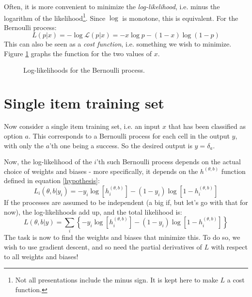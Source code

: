 \documentclass[12pt, a4paper]{article}
\numberwithin{equation}{section}
\begin{document}
Often, it is more convenient to minimize the \textit{log-likelihood}, i.e. minus the logarithm of the likelihood\footnote{Not all presentations include the minus sign. It is kept here to make $L$ a cost function.}. Since $\log$ is monotone, this is equivalent. For the Bernoulli process:
\begin{equation}
L(p|x)=-\log\mathcal{L}(p|x)=-x\log p-(1-x)\log(1-p)
\end{equation}
This can also be seen as a \textit{cost function}, i.e. something we wish to minimize. Figure \ref{fig:bernoulli} graphs the function for the two values of $x$.

\begin{figure}
\centering
{}
\caption{Log-likelihoods for the Bernoulli process.}
\label{fig:bernoulli}
\end{figure}

\section{Single item training set}
Now consider a single item training set, i.e. an input $x$ that has been classified as option $a$. This corresponds to a Bernoulli process for each cell in the output $y$, with only the $a$'th one being a success. So the desired output is $y=\delta_a$.

Now, the log-likelihood of the $i$'th such Bernoulli process depends on the actual choice of weights and biases - more specifically, it depends on the $h^{(\theta,b)}$ function defined in equation \ref{hypothesis}:
\begin{equation}
L_i(\theta,b|y_i)=-y_i\log\left[h^{(\theta,b)}_i\right]-(1-y_i)\log\left[1-h^{(\theta,b)}_i\right]
\end{equation}
If the processes are assumed to be independent (a big if, but let's go with that for now), the log-likelihoods add up, and the total likelihood is:
\begin{equation}
L(\theta,b|y)=\sum_i\left\{-y_i\log\left[h^{(\theta,b)}_i\right]-(1-y_i)\log\left[1-h^{(\theta,b)}_i\right]\right\}
\end{equation}
The task is now to find the weights and biases that minimize this. To do so, we wish to use gradient descent, and so need the partial derivatives of $L$ with respect to all weights and biases!
\end{document}
